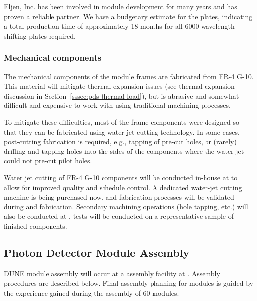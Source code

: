 Eljen, Inc. has been involved in  module development for many years and has proven a reliable partner.  We have a budgetary estimate for the plates, indicating a total production time of approximately \num{18} months for all \num{6000} wavelength-shifting plates required.

\subsubsection{Mechanical components}

The mechanical components of the  module frames are fabricated from
FR-4 G-10. This material will mitigate thermal expansion issues (see thermal expansion discussion in Section~\ref{sssec:pds-thermal-load}),
but is abrasive and somewhat difficult and expensive to work with using traditional machining processes.

To mitigate these difficulties, most of the  frame components were designed so that they can be fabricated using water-jet cutting technology.  In some cases, post-cutting fabrication is required, e.g., tapping of pre-cut holes, or (rarely) drilling and tapping holes into the sides of the components where the water jet could not pre-cut pilot holes.

Water jet cutting of FR-4 G-10 components will be conducted in-house at  to allow for improved quality and schedule control.  A dedicated water-jet cutting machine is being purchased now, and fabrication processes will be validated during  and  fabrication.  Secondary machining operations (hole tapping, etc.) will also be conducted at .   tests will be conducted on a representative sample of finished components.

\label{sec:fdsp-pd-prod-pc}

\subsection{Photon Detector Module Assembly}

DUNE   module assembly will occur at a  assembly facility at .  Assembly procedures are described below.  Final assembly planning for  modules is guided by the experience gained during the assembly of \num{60}   modules. 


